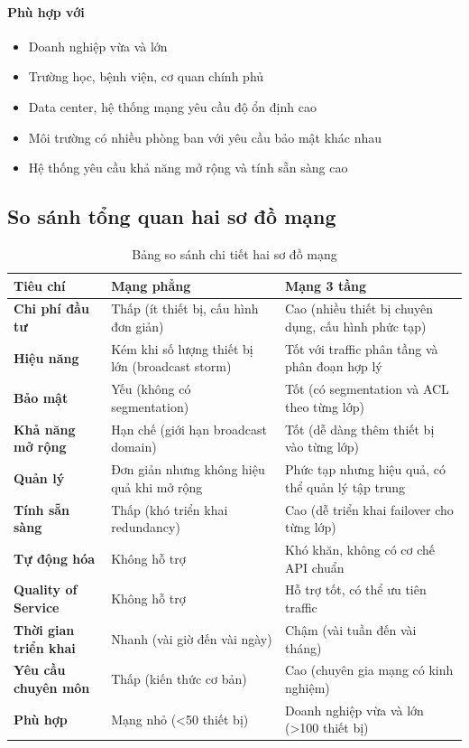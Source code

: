 \paragraph{Phù hợp với}
\begin{itemize}
    \item Doanh nghiệp vừa và lớn
    \item Trường học, bệnh viện, cơ quan chính phủ
    \item Data center, hệ thống mạng yêu cầu độ ổn định cao
    \item Môi trường có nhiều phòng ban với yêu cầu bảo mật khác nhau
    \item Hệ thống yêu cầu khả năng mở rộng và tính sẵn sàng cao
\end{itemize}

\subsection{So sánh tổng quan hai sơ đồ mạng}

\begin{table}[H]
\centering
\caption{Bảng so sánh chi tiết hai sơ đồ mạng}
\label{tab:network_comparison_detail}
\begin{tabular}{|p{4.5cm}|p{6cm}|p{6cm}|}
\hline
\textbf{Tiêu chí} & \textbf{Mạng phẳng} & \textbf{Mạng 3 tầng} \\
\hline
\hline
\textbf{Chi phí đầu tư} & Thấp (ít thiết bị, cấu hình đơn giản) & Cao (nhiều thiết bị chuyên dụng, cấu hình phức tạp) \\
\hline
\textbf{Hiệu năng} & Kém khi số lượng thiết bị lớn (broadcast storm) & Tốt với traffic phân tầng và phân đoạn hợp lý \\
\hline
\textbf{Bảo mật} & Yếu (không có segmentation) & Tốt (có segmentation và ACL theo từng lớp) \\
\hline
\textbf{Khả năng mở rộng} & Hạn chế (giới hạn broadcast domain) & Tốt (dễ dàng thêm thiết bị vào từng lớp) \\
\hline
\textbf{Quản lý} & Đơn giản nhưng không hiệu quả khi mở rộng & Phức tạp nhưng hiệu quả, có thể quản lý tập trung \\
\hline
\textbf{Tính sẵn sàng} & Thấp (khó triển khai redundancy) & Cao (dễ triển khai failover cho từng lớp) \\
\hline
\textbf{Tự động hóa} & Không hỗ trợ & Khó khăn, không có cơ chế API chuẩn \\
\hline
\textbf{Quality of Service} & Không hỗ trợ & Hỗ trợ tốt, có thể ưu tiên traffic \\
\hline
\textbf{Thời gian triển khai} & Nhanh (vài giờ đến vài ngày) & Chậm (vài tuần đến vài tháng) \\
\hline
\textbf{Yêu cầu chuyên môn} & Thấp (kiến thức cơ bản) & Cao (chuyên gia mạng có kinh nghiệm) \\
\hline
\textbf{Phù hợp} & Mạng nhỏ (<50 thiết bị) & Doanh nghiệp vừa và lớn (>100 thiết bị) \\
\hline
\end{tabular}
\end{table}

